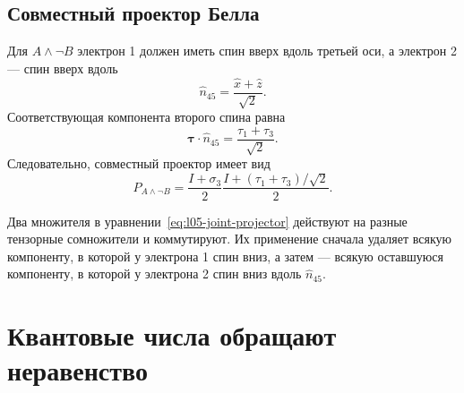\subsection{Совместный проектор Белла}

Для \(A\wedge\neg B\) электрон 1 должен иметь спин вверх вдоль третьей оси, а электрон 2 — спин вверх вдоль
\begin{equation}
  \hat n_{45}=\frac{\hat x+\hat z}{\sqrt2}.
\end{equation}
Соответствующая компонента второго спина равна
\begin{equation}
  \boldsymbol{\tau}\cdot\hat n_{45}
  =
  \frac{\tau_1+\tau_3}{\sqrt2}.
\end{equation}
Следовательно, совместный проектор имеет вид
\begin{equation}
  P_{A\wedge\neg B}
  =
  \frac{I+\sigma_3}{2}
  \frac{I+(\tau_1+\tau_3)/\sqrt2}{2}.
  \label{eq:l05-joint-projector}
\end{equation}

\begin{classroomqa}
\end{classroomqa}

\begin{classroomqa}
\end{classroomqa}

Два множителя в уравнении~\eqref{eq:l05-joint-projector} действуют на разные тензорные сомножители и коммутируют. Их применение сначала удаляет всякую компоненту, в которой у электрона 1 спин вниз, а затем — всякую оставшуюся компоненту, в которой у электрона 2 спин вниз вдоль \(\hat n_{45}\).

\section{Квантовые числа обращают неравенство}

